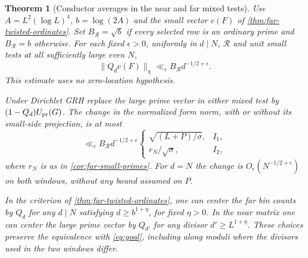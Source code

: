 \documentclass[11pt,a4paper]{article}
\numberwithin{equation}{section}
\newtheorem{theorem}{Theorem}[section]
\begin{document}
\begin{theorem}[Conductor averages in the near and far mixed tests]
\label{thm:conductor-twist-mixed}
Use $A=L^2(\log L)^4$, $b=\log(2A)$ and the small vector $c(F)$
of \cref{thm:far-twisted-ordinates}. Set $B_{\mathcal R}=\sqrt b$
if every selected row is an ordinary prime and $B_{\mathcal R}=b$
otherwise. For each fixed $\epsilon>0$, uniformly in $d\mid N$,
$\mathcal R$ and unit small tests at all sufficiently large even $N$,
\begin{equation}
 \|Q_d c(F)\|_\chi\ll_\epsilon B_{\mathcal R}d^{-1/2+\epsilon}.
 \label{eq:conductor-small-projection}
\end{equation}
This estimate uses no zero-location hypothesis.

Under Dirichlet GRH replace the large prime vector in either mixed
test by $(1-Q_d)U_{\rm pr}(G)$. The change in the normalized form
norm, with or without its small-side projection, is at most
\[
 \ll_\epsilon B_{\mathcal R}d^{-1/2+\epsilon}
 \begin{cases}
 \sqrt{(L+P)/\sigma}, & I_1,\\
 r_N/\sqrt\sigma, & I_2,
 \end{cases}
\]
where $r_N$ is as in \cref{cor:far-small-primes}. For $d=N$ the
change is $O_\epsilon(N^{-1/2+\epsilon})$ on both windows,
without any bound assumed on $P$.

In the criterion of \cref{thm:far-twisted-ordinates}, one can
center the far bin counts by $Q_d$ for any $d\mid N$ satisfying
$d\ge b^{1+\eta}$, for fixed $\eta>0$. In the near matrix one
can center the large prime vector by $Q_{d'}$ for any divisor
$d'\ge L^{1+\eta}$. These choices preserve the equivalence with
\eqref{eq:goal}, including along moduli where the divisors used
in the two windows differ.
\end{theorem}
\end{document}
